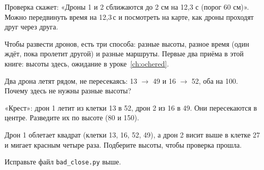 
Проверка скажет: «Дроны 1 и 2 сближаются до 2 см на 12,3 с (порог 60 см)». Можно передвинуть время на 12,3\,с и посмотреть на карте, как дроны проходят друг через друга.

\begin{zametka}
Чтобы развести дронов, есть три способа: разные высоты, разное время (один ждёт, пока пролетит другой) и разные маршруты. Первые два приёма в этой книге: высоты здесь, ожидание в уроке~\ref{ch:ochered}.
\end{zametka}

\begin{probuy}
  \item Два дрона летят рядом, не пересекаясь: 13 $\to$ 49 и 16 $\to$ 52, оба на 100\cm. Почему здесь не нужны разные высоты?
  \item «Крест»: дрон 1 летит из клетки 13 в 52, дрон 2 из 16 в 49. Они пересекаются в центре. Разведите их по высоте (80 и 150\cm).
  \item Дрон 1 облетает квадрат (клетки 13, 16, 52, 49), а дрон 2 висит выше в клетке 27 и мигает красным четыре раза. Подберите высоты, чтобы проверка прошла.
  \item Исправьте файл \texttt{bad\_close.py} выше.
\end{probuy}
